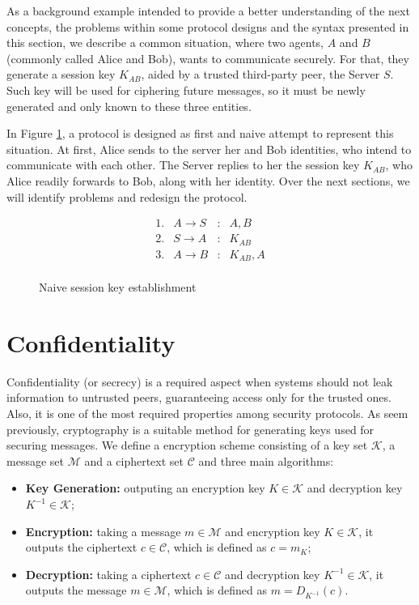 As a background example intended to provide a better understanding of the next concepts, the problems within some protocol designs and the syntax presented in this section, we describe a common situation, where two agents, $A$ and $B$ (commonly called Alice and Bob), wants to communicate securely. For that, they generate a session key $K_{AB}$, aided by a trusted third-party peer, the Server $S$. Such key will be used for ciphering future messages, so it must be newly generated and only known to these three entities.

In Figure \ref{prt:naive-session-key}, a protocol is designed as first and naive attempt to represent this situation. At first, Alice sends to the server her and Bob identities, who intend to communicate with each other. The Server replies to her the session key $K_{AB}$, who Alice readily forwards to Bob, along with her identity. Over the next sections, we will identify problems and redesign the protocol.

\begin{figure}[ht]
  \centering
  \[
    \begin{array}{rlcl}
      1. & A \longrightarrow S & : & A, B \\
      2. & S \longrightarrow A & : & K_{AB} \\
      3. & A \longrightarrow B & : & K_{AB}, A \\
    \end{array}
  \]
  \caption{Naive session key establishment}
  \label{prt:naive-session-key}
\end{figure}





\section{Confidentiality}
Confidentiality (or secrecy) is a required aspect when systems should not leak information to untrusted peers, guaranteeing access only for the trusted ones. Also, it is one of the most required properties among security protocols. As seem previously, cryptography is a suitable method for generating keys used for securing messages. We define a encryption scheme consisting of a key set $\mathcal{K}$, a message set $\mathcal{M}$ and a ciphertext set $\mathcal{C}$ and three main algorithms:

\begin{itemize}
  \item \textbf{Key Generation:} outputing an encryption key $K \in \mathcal{K}$ and decryption key $K^{-1} \in \mathcal{K}$;

  \item \textbf{Encryption:} taking a message $m \in \mathcal{M}$ and encryption key $K \in \mathcal{K}$, it outputs the ciphertext $c \in \mathcal{C}$, which is defined as $c = m_K$;

  \item \textbf{Decryption:} taking a ciphertext $c \in \mathcal{C}$ and decryption key $K^{-1} \in \mathcal{K}$, it outputs the message $m \in \mathcal{M}$, which is defined as $m = D_{K^{-1}}(c)$.
\end{itemize}

